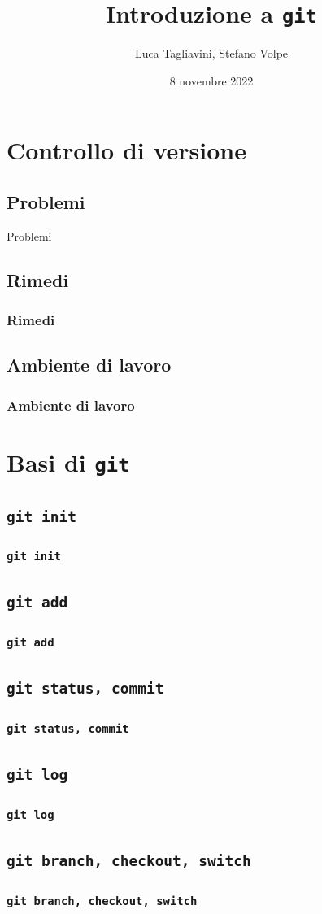 \documentclass{beamer}
\title{Introduzione a \texttt{git}}
\author{Luca Tagliavini, Stefano Volpe}
\institute{Università di Bologna, corso di Laurea in Informatica}
\date{8 novembre 2022}
\begin{document}
\begin{frame} 
  \titlepage
\end{frame}

\section{Controllo di versione}

\subsection{Problemi}
\begin{frame}{Problemi}
\end{frame}

\subsection{Rimedi}
\begin{frame}
  \frametitle{Rimedi}
\end{frame}

\subsection{Ambiente di lavoro}
\begin{frame}
  \frametitle{Ambiente di lavoro}
\end{frame}

\section{Basi di \texttt{git}}

\subsection{\texttt{git init}}
\begin{frame}
  \frametitle{\texttt{git init}}
\end{frame}

\subsection{\texttt{git add}}
\begin{frame}
  \frametitle{\texttt{git add}}
\end{frame}

\subsection{\texttt{git status, commit}}
\begin{frame}
  \frametitle{\texttt{git status, commit}}
\end{frame}

\subsection{\texttt{git log}}
\begin{frame}
  \frametitle{\texttt{git log}}
\end{frame}

\subsection{\texttt{git branch, checkout, switch}}
\begin{frame}
  \frametitle{\texttt{git branch, checkout, switch}}
\end{frame}
\end{document}
